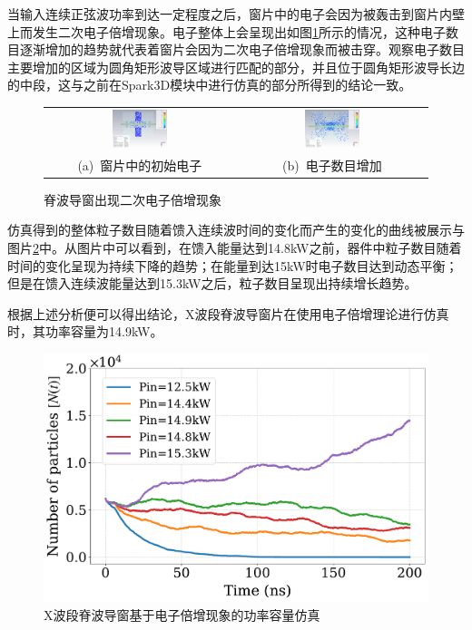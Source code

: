\documentclass[master]{thesis-uestc}
\begin{document}
当输入连续正弦波功率到达一定程度之后，窗片中的电子会因为被轰击到窗片内壁上而发生二次电子倍增现象。电子整体上会呈现出如图\ref{fig:X频段窗电子逐渐增多}所示的情况，这种电子数目逐渐增加的趋势就代表着窗片会因为二次电子倍增现象而被击穿。观察电子数目主要增加的区域为圆角矩形波导区域进行匹配的部分，并且位于圆角矩形波导长边的中段，这与之前在Spark3D模块中进行仿真的部分所得到的结论一致。
\begin{figure}[!htb]
    \small
    \centering
    \begin{tabular}{@{\ }c@{\ }c}
        \includegraphics[width=0.3\textwidth]{pic/chapter3/XPIC初始电子位置.png} & 
        \hspace{5pt}
        \includegraphics[width=0.3\textwidth]{pic/chapter3/XPIC发生击穿电子.png}     \\
        \mbox{\small (a) 窗片中的初始电子}                                                                               & 
        \mbox{\small (b) 电子数目增加}                                                                                  \\
    \end{tabular}
    \caption{脊波导窗出现二次电子倍增现象}
    \label{fig:X频段窗电子逐渐增多}
\end{figure}

仿真得到的整体粒子数目随着馈入连续波时间的变化而产生的变化的曲线被展示与图片\ref{fig:X波段脊波导窗基于电子倍增现象的功率容量仿真}中。从图片中可以看到，在馈入能量达到14.8kW之前，器件中粒子数目随着时间的变化呈现为持续下降的趋势；在能量到达15kW时电子数目达到动态平衡；但是在馈入连续波能量达到15.3kW之后，粒子数目呈现出持续增长趋势。

根据上述分析便可以得出结论，X波段脊波导窗片在使用电子倍增理论进行仿真时，其功率容量为14.9kW。
\begin{figure}[!htb]
    \centering
    \includegraphics[width=0.5\linewidth]{pic/chapter3/particle_time_chapter3.pdf}
    \caption{X波段脊波导窗基于电子倍增现象的功率容量仿真}
    \label{fig:X波段脊波导窗基于电子倍增现象的功率容量仿真}
\end{figure}
\end{document}
